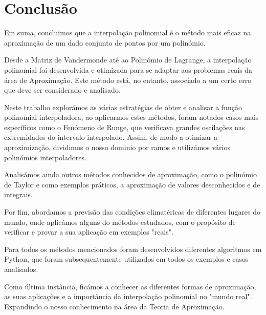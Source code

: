 \documentclass[12pt]{article}
\begin{document}
\section{Conclusão}

\hspace{0.5cm}Em suma, concluimos que a interpolação polinomial é o método mais eficaz na  aproximação de um dado conjunto de pontos por um polinómio.

\hspace{0.5cm} Desde a Matriz de Vandermonde até ao Polinómio de Lagrange, a interpolação polinomial foi desenvolvida e otimizada para se adaptar aos problemas reais da área de Aproximação. Este método está, no entanto, associado a um certo erro que deve ser considerado e analisado.

\hspace{0.5cm}Neste trabalho explorámos as várias estratégias de obter e analisar a função polinomial interpoladora, ao aplicarmos estes métodos, foram notados casos mais específicos como o Fenómeno de Runge, que verificava grandes oscilações nas extremidades do intervalo interpolado. Assim, de modo a otimizar a aproximização, dividimos o nosso dominio por ramos e utilizámos vários polinómios interpoladores.

\hspace{0.5cm}Analisámos ainda outros métodos conhecidos de aproximação, como o polinómio de Taylor e como exemplos práticos, a aproximação de valores desconhecidos e de integrais.

\hspace{0.5cm}Por fim, abordamos a previsão das condições climatéricas de diferentes lugares do mundo, onde aplicámos alguns do métodos estudados, com o propósito de verificar e provar a sua aplicação em exemplos "reais".

\hspace{0.5cm}Para todos os métodos mencionados foram desenvolvidos diferentes algoritmos em Python, que foram subsequentemente utilizados em todos os exemplos e casos analisados.

\hspace{0.5cm}Como última instância, ficámos a conhecer as diferentes formas de aproximação, as suas aplicações e a importância da interpolação polinomial no "mundo real". Expandindo o nosso conhecimento na área da Teoria de Aproximação.




 
\newpage

\printbibliography
\end{document}
